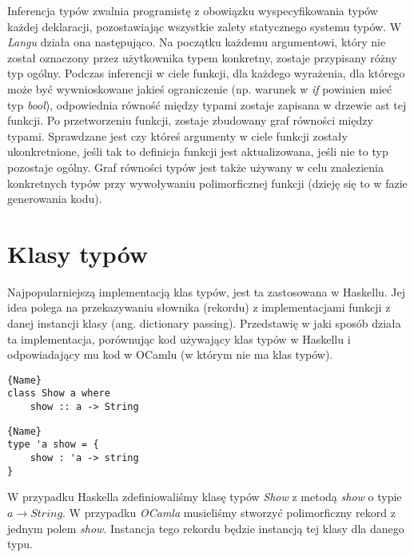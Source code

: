 \documentclass[declaration,shortabstract]{iithesis}
\begin{document}
Inferencja typów zwalnia programistę z obowiązku wyspecyfikowania typów 
każdej deklaracji, pozostawiając wszystkie zalety statycznego systemu typów.
W \textit{Langu} działa ona następująco. Na początku każdemu argumentowi,
który nie został oznaczony przez użytkownika typem konkretny, zostaje 
przypisany różny typ ogólny. Podczas inferencji w ciele funkcji, dla 
każdego wyrażenia, dla którego może być wywnioskowane jakieś ograniczenie 
(np. warunek w \textit{if} powinien mieć typ \textit{bool}), odpowiednia 
równość między typami zostaje zapisana w drzewie ast tej funkcji. Po 
przetworzeniu funkcji, zostaje zbudowany graf równości między typami. 
Sprawdzane jest czy któreś argumenty w ciele funkcji zostały ukonkretnione, 
jeśli tak to definicja funkcji jest aktualizowana, jeśli nie to typ pozostaje
ogólny. Graf równości typów jest także używany w celu znalezienia konkretnych 
typów przy wywoływaniu polimorficznej funkcji (dzieję się to w fazie 
generowania kodu). 

\section{Klasy typów}
Najpopularniejszą implementacją klas typów, jest ta zastosowana w Haskellu. 
Jej idea polega na przekazywaniu słownika (rekordu) z implementacjami funkcji 
z danej instancji klasy (ang. dictionary passing). Przedstawię w jaki sposób 
działa ta implementacja, porównując kod używający klas typów w Haskellu i 
odpowiadający mu kod w OCamlu (w którym nie ma klas typów).

\noindent\begin{minipage}{.45\textwidth}
\begin{lstlisting}[caption=Deklaracja klasy typów w Haskellu, frame=tlrb]{Name}
class Show a where 
    show :: a -> String
\end{lstlisting}
\end{minipage}\hfill
\begin{minipage}{.45\textwidth}
\begin{lstlisting}[caption=Deklaracja odpowiednika klasy typów w OCamlu z
użyciem metody przekazywania słownika, frame=tlrb]{Name}
type 'a show = { 
    show : 'a -> string 
} 
\end{lstlisting}
\end{minipage}

W przypadku Haskella zdefiniowaliśmy klasę typów \textit{Show} z metodą 
\textit{show} o typie $a \rightarrow String$. W przypadku \textit
{OCamla} musieliśmy stworzyć polimorficzny rekord z jednym polem \textit{show}.
Instancja tego rekordu będzie instancją tej klasy dla danego typu. 
\end{document}
